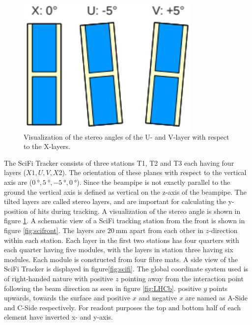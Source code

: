 \begin{figure}
  \centering
  \includegraphics[width=0.8\textwidth]{plots/stereo_angles.png}
  \caption{Visualization of the stereo angles of the U- and V-layer with respect to the X-layers.}
  \label{fig:stereo}
\end{figure}

The SciFi Tracker consists of three stations T1, T2 and T3 each having four layers ($X1, U, V, X2$). The orientation of these planes with respect to the vertical axis are ($\SI{0}{\degree}, \SI{+5}{\degree}, \SI{-5}{\degree}, \SI{0}{\degree}$).
Since the beampipe is not exactly parallel to the ground the vertical axis is
defined as vertical on the z-axis of the beampipe.
The tilted layers are called stereo layers, and are important for calculating the y-position of hits during tracking. A visualization of the stereo angle is shown in figure \ref{fig:stereo}.
A schematic view of a SciFi tracking station\cite{scififront} from the front is shown in figure \ref{fig:scifront}.
The layers are $\SI{20}{\milli\metre}$ apart from each other in $z$-direction within each station.
Each layer in the first two stations has four quarters with each quarter having five modules, with the layers in station three having six modules. Each module is constructed from four fibre mats.
A side view of the SciFi Tracker is displayed in figure\ref{fig:scifi}.
The global coordinate system used is of right-handed nature with positive $z$ pointing away from the interaction point following the beam direction as seen in figure \ref{fig:LHCb}. positive $y$ points upwards, towards the surface and positive $x$ and negative $x$ are named as A-Side and C-Side respectively\cite{scifiInfo}.
For readout purposes the top and bottom half of each element have inverted x- and y-axis.

